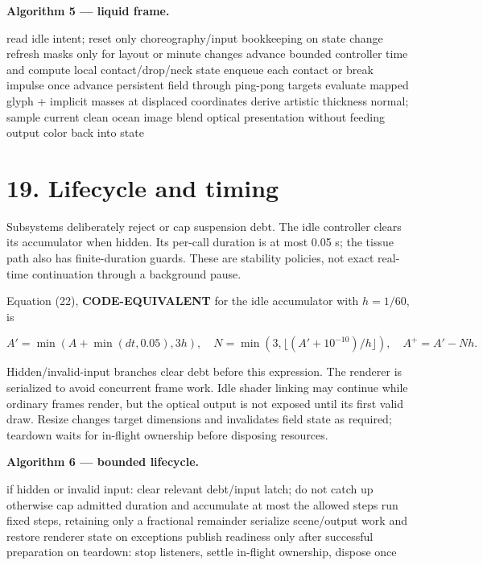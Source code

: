 \documentclass[
  english,
  11pt,
]{article}
\newenvironment{Shaded}{}{}
\newcommand{\NormalTok}[1]{#1}
\begin{document}
\textbf{Algorithm 5 --- liquid frame.}

\begin{Shaded}
\begin{Highlighting}[]
\NormalTok{read idle intent; reset only choreography/input bookkeeping on state change}
\NormalTok{refresh masks only for layout or minute changes}
\NormalTok{advance bounded controller time and compute local contact/drop/neck state}
\NormalTok{enqueue each contact or break impulse once}
\NormalTok{advance persistent field through ping{-}pong targets}
\NormalTok{evaluate mapped glyph + implicit masses at displaced coordinates}
\NormalTok{derive artistic thickness normal; sample current clean ocean image}
\NormalTok{blend optical presentation without feeding output color back into state}
\end{Highlighting}
\end{Shaded}

\section{19. Lifecycle and timing}\label{lifecycle-and-timing}

Subsystems deliberately reject or cap suspension debt. The idle
controller clears its accumulator when hidden. Its per-call duration is
at most 0.05 s; the tissue path also has finite-duration guards. These
are stability policies, not exact real-time continuation through a
background pause.

Equation (22), \textbf{CODE-EQUIVALENT} for the idle accumulator with
\(h=1/60\), is

\[
A'=\min(A+\min(dt,0.05),3h),\quad
N=\min(3,\lfloor(A'+10^{-10})/h\rfloor),\quad A^+=A'-Nh.
\]

Hidden/invalid-input branches clear debt before this expression. The
renderer is serialized to avoid concurrent frame work. Idle shader
linking may continue while ordinary frames render, but the optical
output is not exposed until its first valid draw. Resize changes target
dimensions and invalidates field state as required; teardown waits for
in-flight ownership before disposing resources.

\textbf{Algorithm 6 --- bounded lifecycle.}

\begin{Shaded}
\begin{Highlighting}[]
\NormalTok{if hidden or invalid input: clear relevant debt/input latch; do not catch up}
\NormalTok{otherwise cap admitted duration and accumulate at most the allowed steps}
\NormalTok{run fixed steps, retaining only a fractional remainder}
\NormalTok{serialize scene/output work and restore renderer state on exceptions}
\NormalTok{publish readiness only after successful preparation}
\NormalTok{on teardown: stop listeners, settle in{-}flight ownership, dispose once}
\end{Highlighting}
\end{Shaded}
\end{document}

